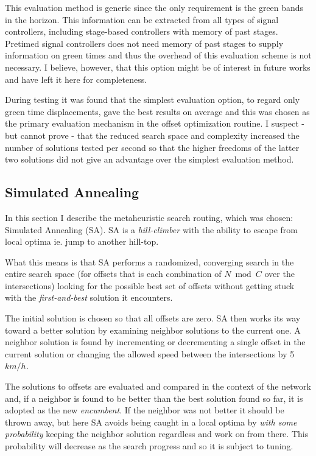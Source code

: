\begin{description}
This evaluation method is generic since the only requirement is the green bands in the horizon. This information can be extracted from all types of signal controllers, including stage-based controllers with memory of past stages. Pretimed signal controllers does not need memory of past stages to supply information on green times and thus the overhead of this evaluation scheme is not necessary. I believe, however, that this option might be of interest in future works and have left it here for completeness.

\end{description}

During testing it was found that the simplest evaluation option, to regard only green time displacements, gave the best results on average and this was chosen as the primary evaluation mechanism in the offset optimization routine. I suspect - but cannot prove - that the reduced search space and complexity increased the number of solutions tested per second so that the higher freedoms of the latter two solutions did not give an advantage over the simplest evaluation method.

\subsection{Simulated Annealing}
\label{siman}
In this section I describe the metaheuristic search routing, which was chosen: Simulated Annealing (SA). 
SA is a \textit{hill-climber} with the ability to escape from local optima ie. jump to another hill-top.

What this means is that SA performs a randomized, converging search in the entire search space (for offsets that is each combination of $N \bmod C$ over the intersections) looking for the possible best set of offsets without getting stuck with the \textit{first-and-best} solution it encounters.

The initial solution is chosen so that all offsets are zero. SA then works its way toward a better solution by examining neighbor solutions to the current one. A neighbor solution is found by incrementing or decrementing a single offset in the current solution or changing the allowed speed between the intersections by 5$km/h$.

The solutions to offsets are evaluated and compared in the context of the network and, if a neighbor is found to be better than the best solution found so far, it is adopted as the new \textit{encumbent}. If the neighbor was not better it should be thrown away, but here SA avoids being caught in a local optima by \textit{with some probability} keeping the neighbor solution regardless and work on from there. This probability will decrease as the search progress and so it is subject to tuning.

